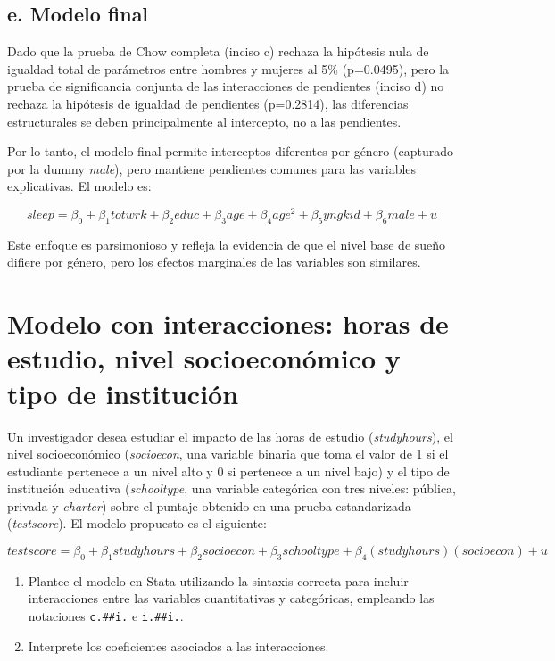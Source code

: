 \documentclass[12pt]{article}
\begin{document}
\subsection*{e. Modelo final}

Dado que la prueba de Chow completa (inciso c) rechaza la hipótesis nula de igualdad total de parámetros entre hombres y mujeres al 5\% (p=0.0495), pero la prueba de significancia conjunta de las interacciones de pendientes (inciso d) no rechaza la hipótesis de igualdad de pendientes (p=0.2814), las diferencias estructurales se deben principalmente al intercepto, no a las pendientes. 

Por lo tanto, el modelo final permite interceptos diferentes por género (capturado por la dummy \textit{male}), pero mantiene pendientes comunes para las variables explicativas. El modelo es:

\[
sleep = \beta_0 + \beta_1 totwrk + \beta_2 educ + \beta_3 age + \beta_4 age^2 + \beta_5 yngkid + \beta_6 male + u
\]

Este enfoque es parsimonioso y refleja la evidencia de que el nivel base de sueño difiere por género, pero los efectos marginales de las variables son similares.


\section{Modelo con interacciones: horas de estudio, nivel socioeconómico y tipo de institución}

Un investigador desea estudiar el impacto de las horas de estudio (\textit{studyhours}), 
el nivel socioeconómico (\textit{socioecon}, una variable binaria que toma el valor de 1 si el estudiante 
pertenece a un nivel alto y 0 si pertenece a un nivel bajo) y el tipo de institución educativa 
(\textit{schooltype}, una variable categórica con tres niveles: pública, privada y \textit{charter}) 
sobre el puntaje obtenido en una prueba estandarizada (\textit{testscore}). 
El modelo propuesto es el siguiente:

\[
testscore = \beta_{0} + \beta_{1}studyhours + \beta_{2}socioecon 
+ \beta_{3}schooltype + \beta_{4}(studyhours)(socioecon) + u
\]

\begin{enumerate}[label=\alph*)]
    \item Plantee el modelo en Stata utilizando la sintaxis correcta para incluir interacciones entre 
    las variables cuantitativas y categóricas, empleando las notaciones \texttt{c.\#\#i.} e \texttt{i.\#\#i.}.
    \item Interprete los coeficientes asociados a las interacciones.
\end{enumerate}
\end{document}
